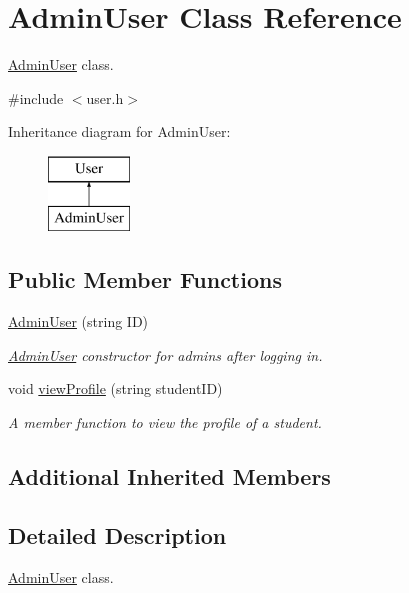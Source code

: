 \hypertarget{class_admin_user}{}\section{Admin\+User Class Reference}
\label{class_admin_user}


\hyperlink{class_admin_user}{Admin\+User} class.  




{\ttfamily \#include $<$user.\+h$>$}

Inheritance diagram for Admin\+User\+:\begin{figure}[H]
\begin{center}
\leavevmode
\includegraphics[height=2.000000cm]{class_admin_user}
\end{center}
\end{figure}
\subsection*{Public Member Functions}
\begin{DoxyCompactItemize}
\item 
\hyperlink{class_admin_user_a0d2bb23705126f8f07af33c915a1c21c}{Admin\+User} (string I\+D)
\begin{DoxyCompactList}\small\item\em \hyperlink{class_admin_user}{Admin\+User} constructor for admins after logging in. \end{DoxyCompactList}\item 
void \hyperlink{class_admin_user_a3f481e9aecf194dad67b6a702ed18e41}{view\+Profile} (string student\+I\+D)
\begin{DoxyCompactList}\small\item\em A member function to view the profile of a student. \end{DoxyCompactList}\end{DoxyCompactItemize}
\subsection*{Additional Inherited Members}


\subsection{Detailed Description}
\hyperlink{class_admin_user}{Admin\+User} class. 


